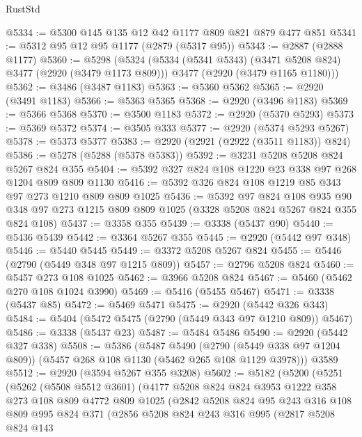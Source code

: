 \begin{lexlean}{RustStd}
\begin{coremodule}
@5334 := @5300 @145 @135 @12 @42 @1177 @809 @821 @879 @477 @851
@5341 := @5312 @95 @12 @95 @1177 (@2879 (@5317 @95))
@5343 := @2887 (@2888 @1177)
@5360 := @5298
    (@5324
      (@5334 (@5341 @5343) (@3471 @5208 @824) @3477 (@2920 (@3479 @1173 @809)))
      @3477
      (@2920 (@3479 @1165 @1180)))
@5362 := @3486 (@3487 @1183)
@5363 := @5360 @5362
@5365 := @2920 (@3491 @1183)
@5366 := @5363 @5365
@5368 := @2920 (@3496 @1183)
@5369 := @5366 @5368
@5370 := @3500 @1183
@5372 := @2920 (@5370 @5293)
@5373 := @5369 @5372
@5374 := @3505 @333
@5377 := @2920 (@5374 @5293 @5267)
@5378 := @5373 @5377
@5383 := @2920 (@2921 (@2922 (@3511 @1183)) @824)
@5386 := @5278 (@5288 (@5378 @5383))
@5392 := @3231 @5208 @5208 @824 @5267 @824 @355
@5404 := @5392 @327 @824 @108 @1220 @23 @338 @97 @268 @1204 @809 @809 @1130
@5416 := @5392 @326 @824 @108 @1219 @85 @343 @97 @273 @1210 @809 @809 @1025
@5436 := @5392
    @97
    @824
    @108
    @935
    @90
    @348
    @97
    @273
    @1215
    @809
    @809
    @1025
    (@3328 @5208 @824 @5267 @824 @355 @824 @108)
@5437 := @3358 @355
@5439 := @3338 (@5437 @90)
@5440 := @5436 @5439
@5442 := @3364 @5267 @355
@5445 := @2920 (@5442 @97 @348)
@5446 := @5440 @5445
@5449 := @3372 @5208 @5267 @824
@5455 := @5446 (@2790 (@5449 @348 @97 @1215 @809))
@5457 := @2796 @5208 @824
@5460 := @5457 @273 @108 @1025
@5462 := @3966 @5208 @824
@5467 := @5460 (@5462 @270 @108 @1024 @3990)
@5469 := @5416 (@5455 @5467)
@5471 := @3338 (@5437 @85)
@5472 := @5469 @5471
@5475 := @2920 (@5442 @326 @343)
@5484 := @5404 (@5472 @5475 (@2790 (@5449 @343 @97 @1210 @809)) @5467)
@5486 := @3338 (@5437 @23)
@5487 := @5484 @5486
@5490 := @2920 (@5442 @327 @338)
@5508 := @5386
    (@5487
      @5490
      (@2790 (@5449 @338 @97 @1204 @809))
      (@5457 @268 @108 @1130 (@5462 @265 @108 @1129 @3978)))
    @3589
@5512 := @2920 (@3594 @5267 @355 @3208)
@5602 := @5182
    (@5200
      (@5251
        (@5262
          (@5508 @5512 @3601)
          (@4177
            @5208
            @824
            @824
            @3953
            @1222
            @358
            @273
            @108
            @809
            @4772
            @809
            @1025
            (@2842
              @5208
              @824
              @95
              @243
              @316
              @108
              @809
              @995
              @824
              @371
              (@2856
                @5208
                @824
                @243
                @316
                @995
                (@2817
                  @5208
                  @824
                  @143

\end{coremodule}
\end{lexlean}
